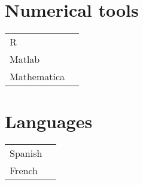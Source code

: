\documentclass[a4paper,10pt]{article}
\begin{document}
{\begin{minipage}[t]{0.6\textwidth}
\MySkip

\begin{multicols}{2}
\section*{Numerical tools}
\begin{tabular}{ll}
R              & \SkillBull{$\bullet\bullet\bullet\,\circ$} \\
Matlab         & \SkillBull{$\bullet\bullet\bullet\,\circ$} \\
Mathematica    & \SkillBull{$\bullet\,\circ\,\circ\,\circ$} \\
\end{tabular}

\vfill\null \columnbreak

\section*{Languages}
\begin{tabular}{ll}
  Spanish        & \SkillBull{$\bullet \bullet \bullet \, \circ$}\\
  French         & \SkillBull{$\bullet \, \circ \, \circ \, \circ$}\\
\end{tabular}

\end{multicols}

\LastUpdate

\end{minipage}%
}
\end{document}

